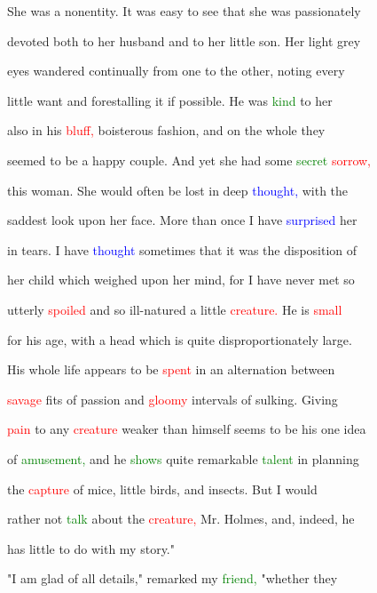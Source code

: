  She was a nonentity. It was easy to see that she was passionately

 devoted both to her husband and to her little son. Her light grey

 eyes wandered continually from one to the other, noting every

 little want and forestalling it if possible. He was \textcolor{green}{kind} to her

 also in his \textcolor{red}{bluff,} \textcolor{BurntOrange}{boisterous} fashion, and on the whole they

 seemed to be a \textcolor{BurntOrange}{happy} couple. And yet she had some \textcolor{green}{secret} \textcolor{red}{sorrow,}

 this woman. She would often be \textcolor{BurntOrange}{lost} in deep \textcolor{blue}{thought,} with the

 saddest look upon her face. More than once I have \textcolor{blue}{surprised} her

 in tears. I have \textcolor{blue}{thought} sometimes that it was the disposition of

 her \textcolor{BurntOrange}{child} which \textcolor{BurntOrange}{weighed} upon her mind, for I have never met so

 utterly \textcolor{red}{spoiled} and so ill-natured a little \textcolor{red}{creature.} He is \textcolor{red}{small}

 for his age, with a head which is quite disproportionately large.

 His whole life appears to be \textcolor{red}{spent} in an alternation between

 \textcolor{red}{savage} fits of \textcolor{BurntOrange}{passion} and \textcolor{red}{gloomy} intervals of sulking. Giving

 \textcolor{red}{pain} to any \textcolor{red}{creature} weaker than himself seems to be his one idea

 of \textcolor{green}{amusement,} and he \textcolor{green}{shows} quite \textcolor{BurntOrange}{remarkable} \textcolor{green}{talent} in \textcolor{BurntOrange}{planning}

 the \textcolor{red}{capture} of mice, little birds, and insects. But I would

 rather not \textcolor{green}{talk} about the \textcolor{red}{creature,} Mr. Holmes, and, indeed, he

 has little to do with my story."



 "I am \textcolor{BurntOrange}{glad} of all details," remarked my \textcolor{green}{friend,} "whether they


